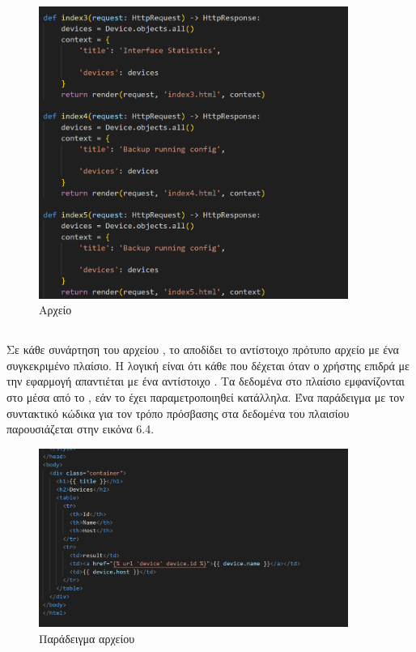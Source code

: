 \FloatBarrier

\begin{figure}[htb]
	\centering
	\includegraphics[width=0.9\textwidth]{graphics/viewspy.png}
	\caption{Αρχείο  }
\end{figure}

\FloatBarrier

\subsection{}


Σε κάθε συνάρτηση του αρχείου , το  αποδίδει το αντίστοιχο πρότυπο 
αρχείο με ένα συγκεκριμένο πλαίσιο. Η λογική είναι ότι κάθε  που δέχεται όταν ο χρήστης επιδρά με την εφαρμογή απαντιέται με ένα αντίστοιχο  . Τα δεδομένα στο πλαίσιο εμφανίζονται
στο  μέσα από το , εάν το  έχει παραμετροποιηθεί κατάλληλα. Ένα παράδειγμα  με
τον συντακτικό κώδικα για τον τρόπο πρόσβασης στα δεδομένα του πλαισίου παρουσιάζεται στην εικόνα 6.4.

\FloatBarrier

\begin{figure}[htb]
	\centering
	\includegraphics[width=0.9\textwidth]{graphics/html_template.png}
	\caption{Παράδειγμα  αρχείου }
\end{figure}

